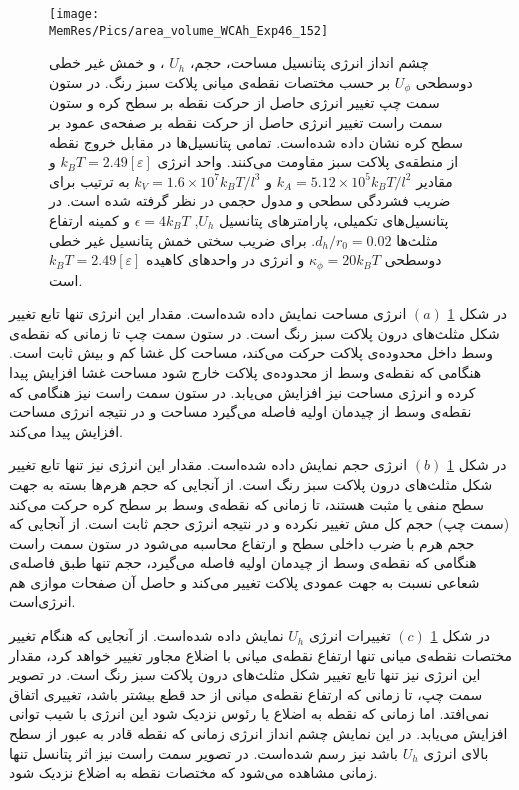 \begin{figure}[htbp]
\begin{center}
\texttt{[image: \\MemRes/Pics/area\_volume\_WCAh\_Exp46\_152]}
\caption{
چشم انداز انرژی پتانسیل مساحت، حجم،
$U_h$
، و خمش غیر خطی دوسطحی
$U_\phi$
 بر حسب مختصات نقطه‌ی میانی پلاکت سبز رنگ. در ستون سمت چپ تغییر انرژی حاصل از حرکت نقطه بر سطح کره و ستون سمت راست تغییر انرژی حاصل از حرکت نقطه بر صفحه‌ی عمود بر سطح کره  نشان داده شده‌است. تمامی پتانسیل‌ها در مقابل خروج نقطه از منطقه‌ی پلاکت سبز مقاومت می‌کنند. واحد انرژی
$k_BT=2.49[\varepsilon]$
 و مقادیر 
 $k_A=5.12\times10^5k_BT/l^2$
 و
 $k_V=1.6\times10^7k_BT/l^3$
 به ترتیب برای ضریب فشردگی سطحی و مدول حجمی در نظر گرفته شده است. در پتانسیل‌های تکمیلی، پارامتر‌های پتانسیل 
 $U_h$, $\epsilon=4k_BT$
 و کمینه ارتفاع مثلث‌ها 
 $d_h/r_0=0.02$.
 برای ضریب سختی خمش پتانسیل غیر خطی دوسطحی 
 $\kappa_{\phi}=20k_BT$
 و انرژی در واحد‌های کاهیده
 $k_BT=2.49[\varepsilon]$
 است.
}
\label{fig:PlacketEnergyArea}
\end{center}
\end{figure}

در شکل 
\ref{fig:PlacketEnergyArea} $(a)$
 انرژی مساحت نمایش داده شده‌است. مقدار این انرژی تنها تابع تغییر شکل مثلث‌های درون پلاکت سبز رنگ است. در ستون سمت چپ تا زمانی که نقطه‌ی وسط داخل محدوده‌ی پلاکت حرکت می‌کند، مساحت کل غشا کم و بیش ثابت است. هنگامی‌ که نقطه‌ی وسط از محدوده‌ی پلاکت خارج شود مساحت غشا افزایش پیدا کرده و انرژی مساحت نیز افزایش می‌یابد. در ستون سمت راست نیز هنگامی که نقطه‌ی وسط از چیدمان اولیه فاصله می‌گیرد مساحت و در نتیجه انرژی مساحت افزایش پیدا می‌کند. 

در شکل 
\ref{fig:PlacketEnergyArea} $(b)$
 انرژی حجم نمایش داده شده‌است. مقدار این انرژی نیز تنها تابع تغییر شکل مثلث‌های درون پلاکت سبز رنگ است. از آنجایی که حجم هرم‌ها بسته به جهت سطح منفی یا مثبت هستند، تا زمانی که نقطه‌ی وسط بر سطح کره حرکت می‌کند (سمت چپ) حجم کل مش تغییر نکرده و در نتیجه انرژی حجم ثابت است.‌ از آنجایی که حجم هرم با ضرب داخلی سطح و ارتفاع محاسبه می‌شود در ستون سمت راست  هنگامی که نقطه‌ی وسط از چیدمان اولیه فاصله می‌گیرد، حجم تنها طبق فاصله‌ی شعاعی نسبت به جهت عمودی پلاکت تغییر می‌کند و حاصل آن صفحات موازی هم انرژی‌است.

در شکل 
\ref{fig:PlacketEnergyArea} $(c)$
تغییرات انرژی 
$U_h$
 نمایش داده شده‌است. از آنجایی که هنگام تغییر مختصات نقطه‌ی میانی تنها ارتفاع نقطه‌ی میانی با اضلاع مجاور تغییر خواهد کرد، مقدار این انرژی نیز تنها تابع تغییر شکل مثلث‌های درون پلاکت سبز رنگ است. در تصویر سمت چپ، تا زمانی که ارتفاع نقطه‌ی میانی از حد قطع بیشتر باشد، تغییری اتفاق نمی‌افتد. اما زمانی که نقطه به اضلاع یا رئوس نزدیک شود این انرژی با شیب توانی افزایش می‌یابد. در این نمایش چشم انداز انرژی زمانی که نقطه قادر به عبور از سطح بالای انرژی 
 $U_h$
 باشد نیز رسم شده‌است. در تصویر سمت راست نیز اثر پتانسل تنها زمانی مشاهده می‌شود که مختصات نقطه به اضلاع نزدیک شود.
 
